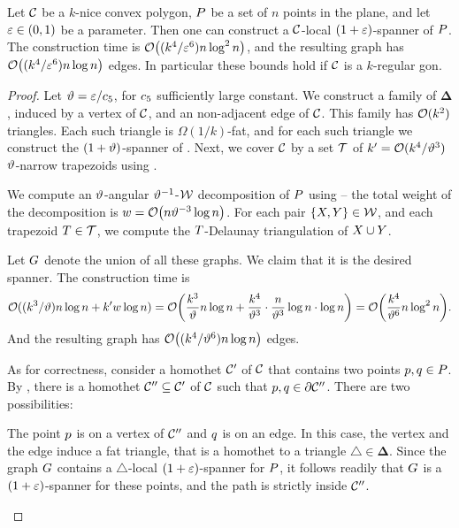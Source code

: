 \documentclass[12pt]{article}%
\begin{document}
\begin{theorem}
    Let $\mathcal{C}$ be a $k$-nice convex polygon, $P$ be a set of $n$
    points in the plane, and let $\varepsilon \in (0,1)$ be a parameter. Then
    one can construct a $\mathcal{C}$-local $(1+\varepsilon)$-spanner of $P$.  The
    construction time is $\Of\pth{\bigl. ({k^4}/{\eps^6})n \log^2 n}$,
    and the resulting graph has
    $\Of\pth{\bigl. ( {k^4}/{\eps^6})n \log n}$ edges. In particular
    these bounds hold if $\mathcal{C}$ is a $k$-regular gon.
\end{theorem}
\newcommand{\Triangles}{\bm\Delta}%
\begin{proof}
    Let $\vartheta = \varepsilon/c_5$, for $c_5$ sufficiently large
    constant.  We construct a family of $\Triangles$, induced by a
    vertex of $\mathcal{C}$, and an non-adjacent edge of $\mathcal{C}$. This
    family has $\mathcal{O}(k^2)$ triangles. Each such triangle is
    $\Omega(1/k)$-fat, and for each such triangle we construct the
    $(1+\vartheta)$-spanner of . Next, we cover $\mathcal{C}$
    by a set $\mathcal{T}$ of $k' = \mathcal{O}(k^4/\vartheta^3)$ $\vartheta$-narrow
    trapezoids using .

    We compute an $\vartheta$-angular $\vartheta^{-1}$-\SSPD $\mathcal{W}$
    decomposition of $P$ using  -- the total
    weight of the decomposition is
    $w = \Of\pth{ n \epsA^{-3} \log n }$. For each pair
    $\{X, Y\} \in \mathcal{W}$, and each trapezoid $T \in \mathcal{T}$, we
    compute the $T$-Delaunay triangulation of $X \cup Y$.

    Let $G$ denote the union of all these graphs. We claim that it is
    the desired spanner.  The construction time is
    \begin{equation*}
        \Of(( k^3 /\epsA) n \log n + k' w \log n)
        =%
        \Of\pth{
           \frac{k^3 }{\epsA} n \log n + \frac{k^4}{\epsA^3} \cdot
           \frac{n}{\epsA^{3}} \log n \cdot \log n
        }%
        =%
        \Of\pth{ \frac{k^4}{\epsA^6}n \log^2 n}.%
    \end{equation*}
    And the resulting graph has
    $\Of\pth{\bigl. ( {k^4}/{\epsA^6})n \log n}$ edges.
    
    As for correctness, consider a homothet $\mathcal{C}'$ of $\mathcal{C}$ that
    contains two points $p, q \in P$. By ,
    there is a homothet $\mathcal{C}'' \subseteq \mathcal{C}'$ of $\mathcal{C}$ such
    that $p, q \in \partial \mathcal{C}''$. There are two possibilities:
    \begin{compactitem}
        \item The point $p$ is on a vertex of $\mathcal{C}''$ and $q$ is
        on an edge. In this case, the vertex and the edge induce a fat
        triangle, that is a homothet to a triangle
        $\triangle \in \Triangles$. Since the graph $G$ contains a
        $\triangle$-local $(1+\varepsilon)$-spanner for $P$, it follows
        readily that $G$ is a $(1+\varepsilon)$-spanner for these points,
        and the path is strictly inside $\mathcal{C}''$.


\end{compactitem}
\end{proof}
\end{document}
